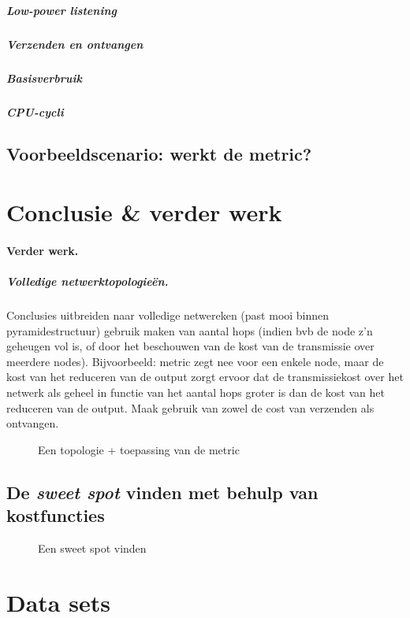 \documentclass{article}
\begin{document}

\subparagraph{Low-power listening}

\subparagraph{Verzenden en ontvangen}

\subparagraph{Basisverbruik}

\subparagraph{CPU-cycli}

\subsection{Voorbeeldscenario: werkt de metric?}

\section{Conclusie \& verder werk}

\paragraph{Verder werk.}
 
\subparagraph{Volledige netwerktopologie\"en.}

Conclusies uitbreiden naar volledige netwereken (past mooi binnen
pyramidestructuur) gebruik maken van aantal hops (indien bvb de node z’n
geheugen vol is, of door het beschouwen van de kost van de transmissie over
meerdere nodes). Bijvoorbeeld: metric zegt nee voor een enkele node, maar de
kost van het reduceren van de output zorgt ervoor dat de transmissiekost over
het netwerk als geheel in functie van het aantal hops groter is dan de kost van
het reduceren van de output. Maak gebruik van zowel de cost van verzenden als
ontvangen.

\begin{figure}[h]
\centering
\missingfigure{}
\caption{Een topologie + toepassing van de metric}
\label{fig:voorbeeld_topologie}
\end{figure}

\subsection{De \textit{sweet spot} vinden met behulp van kostfuncties}

\begin{figure}[h]
\centering
\missingfigure{}
\caption{Een sweet spot vinden}
\label{fig:sweet_spot}
\end{figure}


\nocite{*}


\newpage
\appendix
\section{Data sets}
\end{document}
